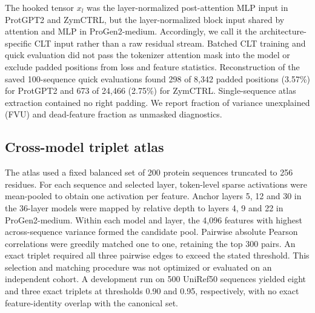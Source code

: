 \documentclass[pdflatex,sn-nature]{sn-jnl}
\begin{document}
The hooked tensor $x_l$ was the layer-normalized post-attention MLP input in ProtGPT2 and ZymCTRL, but the layer-normalized block input shared by attention and MLP in ProGen2-medium. Accordingly, we call it the architecture-specific CLT input rather than a raw residual stream. Batched CLT training and quick evaluation did not pass the tokenizer attention mask into the model or exclude padded positions from loss and feature statistics. Reconstruction of the saved 100-sequence quick evaluations found 298 of 8,342 padded positions (3.57\%) for ProtGPT2 and 673 of 24,466 (2.75\%) for ZymCTRL. Single-sequence atlas extraction contained no right padding. We report fraction of variance unexplained (FVU) and dead-feature fraction as unmasked diagnostics.

\subsection{Cross-model triplet atlas}

The atlas used a fixed balanced set of 200 protein sequences truncated to 256 residues. For each sequence and selected layer, token-level sparse activations were mean-pooled to obtain one activation per feature. Anchor layers 5, 12 and 30 in the 36-layer models were mapped by relative depth to layers 4, 9 and 22 in ProGen2-medium. Within each model and layer, the 4,096 features with highest across-sequence variance formed the candidate pool. Pairwise absolute Pearson correlations were greedily matched one to one, retaining the top 300 pairs. An exact triplet required all three pairwise edges to exceed the stated threshold. This selection and matching procedure was not optimized or evaluated on an independent cohort. A development run on 500 UniRef50 sequences yielded eight and three exact triplets at thresholds 0.90 and 0.95, respectively, with no exact feature-identity overlap with the canonical set.
\end{document}
